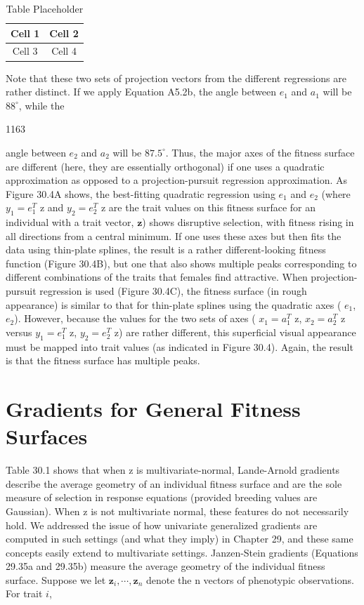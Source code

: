\documentclass{article}
\begin{document}
\begin{table}[h]
\centering
\begin{tabular}{|c|c|}
\hline
Cell 1 & Cell 2 \\
\hline
Cell 3 & Cell 4 \\
\hline
\end{tabular}
\caption{Table Placeholder}
\end{table}

Note that these two sets of projection vectors from the different regressions are rather distinct. If we apply Equation A5.2b, the angle between  $ e_1 $ and  $ a_1 $ will be  $ 88^\circ $, while the

1163

angle between  $ e_2 $ and  $ a_2 $ will be  $ 87.5^\circ $. Thus, the major axes of the fitness surface are different (here, they are essentially orthogonal) if one uses a quadratic approximation as opposed to a projection-pursuit regression approximation. As Figure 30.4A shows, the best-fitting quadratic regression using  $ e_1 $ and  $ e_2 $ (where  $ y_1 = e_1^T $ z and  $ y_2 = e_2^T $ z are the trait values on this fitness surface for an individual with a trait vector,  $ \mathbf{z} $) shows disruptive selection, with fitness rising in all directions from a central minimum. If one uses these axes but then fits the data using thin-plate splines, the result is a rather different-looking fitness function (Figure 30.4B), but one that also shows multiple peaks corresponding to different combinations of the traits that females find attractive. When projection-pursuit regression is used (Figure 30.4C), the fitness surface (in rough appearance) is similar to that for thin-plate splines using the quadratic axes ( $ e_1 $,  $ e_2 $). However, because the values for the two sets of axes ( $ x_1 = a_1^T $ z,  $ x_2 = a_2^T $ z versus  $ y_1 = e_1^T $ z,  $ y_2 = e_2^T $ z) are rather different, this superficial visual appearance must be mapped into trait values (as indicated in Figure 30.4). Again, the result is that the fitness surface has multiple peaks.

\section{Gradients for General Fitness Surfaces}
Table 30.1 shows that when z is multivariate-normal, Lande-Arnold gradients describe the average geometry of an individual fitness surface and are the sole measure of selection in response equations (provided breeding values are Gaussian). When z is not multivariate normal, these features do not necessarily hold. We addressed the issue of how univariate generalized gradients are computed in such settings (and what they imply) in Chapter 29, and these same concepts easily extend to multivariate settings. Janzen-Stein gradients (Equations 29.35a and 29.35b) measure the average geometry of the individual fitness surface. Suppose we let  $ \mathbf{z}_{i}, \cdots, \mathbf{z}_{n} $ denote the n vectors of phenotypic observations. For trait  $ i $,
\end{document}
